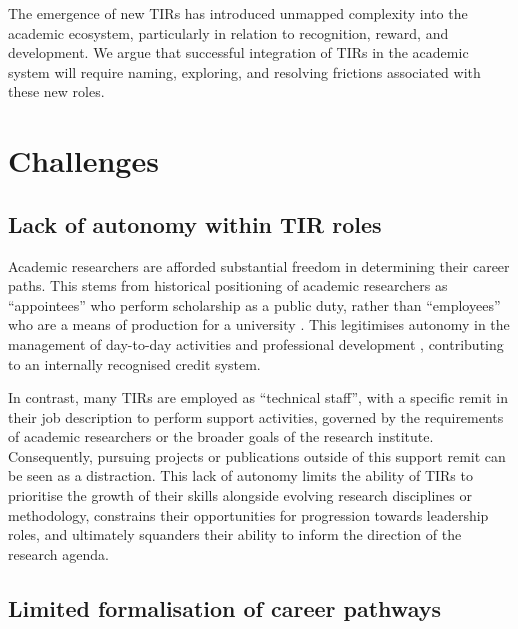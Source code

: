 \documentclass[authordate,meta,issue]{jote-new-article}
\begin{document}
The emergence of new TIRs has introduced unmapped complexity into the academic ecosystem, particularly in relation to recognition, reward, and development. We argue that successful integration of TIRs in the academic system will require naming, exploring, and resolving frictions associated with these new roles.



\section{Challenges}



\subsection{Lack of autonomy within TIR roles}



Academic researchers are afforded substantial freedom in determining their career paths. This stems from historical positioning of academic researchers as “appointees” who perform scholarship as a public duty, rather than “employees” who are a means of production for a university \parencites{Finkin2011}. This legitimises autonomy in the management of day-to-day activities and professional development \parencites{Wolf2021}, contributing to an internally recognised credit system.







In contrast, many TIRs are employed as “technical staff”, with a specific remit in their job description to perform support activities, governed by the requirements of academic researchers or the broader goals of the research institute. Consequently, pursuing projects or publications outside of this support remit can be seen as a distraction. This lack of autonomy limits the ability of TIRs to prioritise the growth of their skills alongside evolving research disciplines or methodology, constrains their opportunities for progression towards leadership roles, and ultimately squanders their ability to inform the direction of the research agenda.



\subsection{Limited formalisation of career pathways}
\end{document}
